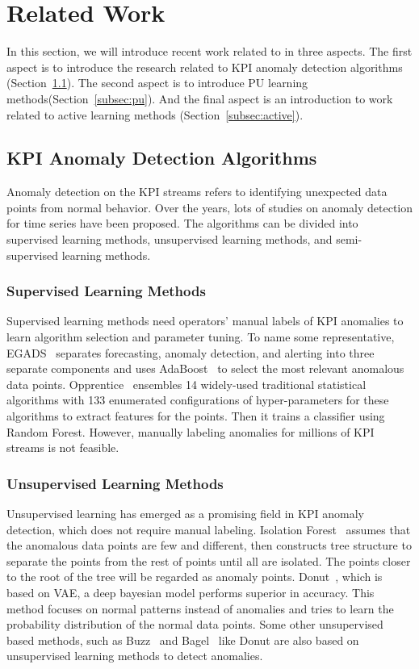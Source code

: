 \section{Related Work}
\label{sec:related}
In this section, we will introduce recent work related to \name{} in three aspects. The first aspect is to introduce the research related to KPI anomaly detection algorithms (Section~\ref{subsec:KPI anomaly detection algorithms}). The second aspect is to introduce PU learning methods(Section~\ref{subsec:pu}). And the final aspect is an introduction to work related to active learning methods (Section~\ref{subsec:active}).

\subsection{KPI Anomaly Detection Algorithms}
\label{subsec:KPI anomaly detection algorithms}
Anomaly detection on the KPI streams refers to identifying unexpected data points from normal behavior. Over the years, lots of studies on anomaly detection for time series have been proposed. The algorithms can be divided into supervised learning methods, unsupervised learning methods, and semi-supervised learning methods.

\subsubsection{Supervised Learning Methods}
Supervised learning methods need operators' manual labels of KPI anomalies to learn algorithm selection and parameter tuning. To name some representative, EGADS~\cite{egads} separates forecasting, anomaly detection, and alerting into three separate components and uses AdaBoost~\cite{freund1997decision} to select the most relevant anomalous data points. Opprentice~\cite{liu2015opprentice} ensembles 14 widely-used traditional statistical algorithms with 133 enumerated configurations of hyper-parameters for these algorithms to extract features for the points. Then it trains a classifier using Random Forest. However, manually labeling anomalies for millions of KPI streams is not feasible.

\subsubsection{Unsupervised Learning Methods}
Unsupervised learning has emerged as a promising field in KPI anomaly detection, which does not require manual labeling. Isolation Forest~\cite{ding2013anomaly} assumes that the anomalous data points are few and different, then constructs tree structure to separate the points from the rest of points until all are isolated. The points closer to the root of the tree will be regarded as anomaly points.
Donut~\cite{xu2018unsupervised}, which is based on VAE, a deep bayesian model performs superior in accuracy. This method focuses on normal patterns instead of anomalies and tries to learn the probability distribution of the normal data points. Some other unsupervised based methods, such as Buzz~\cite{chen2019unsupervised} and Bagel~\cite{li2018robust} like Donut are also based on unsupervised learning methods to detect anomalies.

